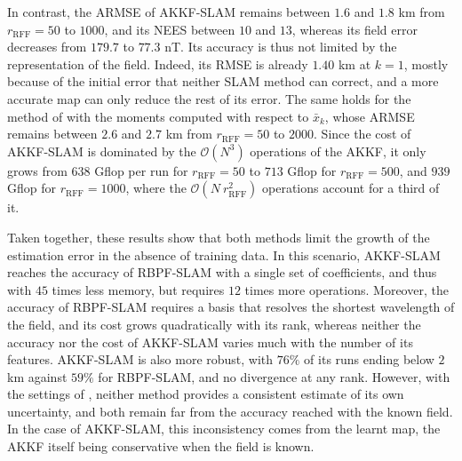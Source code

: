 In contrast, the ARMSE of AKKF-SLAM remains between $1.6$ and $1.8$ km from $r_{\mathrm{RFF}}=50$ to $1000$, and its NEES between $10$ and $13$, whereas its field error decreases from $179.7$ to $77.3$ nT. Its accuracy is thus not limited by the representation of the field. Indeed, its RMSE is already $1.40$ km at $k=1$, mostly because of the initial error that neither SLAM method can correct, and a more accurate map can only reduce the rest of its error. The same holds for the method of \cite{bib:RFF-KKF-SLAM} with the moments computed with respect to $\bar{x}_k$, whose ARMSE remains between $2.6$ and $2.7$ km from $r_{\mathrm{RFF}}=50$ to $2000$. Since the cost of AKKF-SLAM is dominated by the $\mathcal{O}\left(N^3\right)$ operations of the AKKF, it only grows from $638$ Gflop per run for $r_{\mathrm{RFF}}=50$ to $713$ Gflop for $r_{\mathrm{RFF}}=500$, and $939$ Gflop for $r_{\mathrm{RFF}}=1000$, where the $\mathcal{O}\left(N\:r_{\mathrm{RFF}}^2\right)$ operations account for a third of it.

Taken together, these results show that both methods limit the growth of the estimation error in the absence of training data. In this scenario, AKKF-SLAM reaches the accuracy of RBPF-SLAM with a single set of coefficients, and thus with $45$ times less memory, but requires $12$ times more operations. Moreover, the accuracy of RBPF-SLAM requires a basis that resolves the shortest wavelength of the field, and its cost grows quadratically with its rank, whereas neither the accuracy nor the cost of AKKF-SLAM varies much with the number of its features. AKKF-SLAM is also more robust, with $76\%$ of its runs ending below $2$ km against $59\%$ for RBPF-SLAM, and no divergence at any rank. However, with the settings of , neither method provides a consistent estimate of its own uncertainty, and both remain far from the accuracy reached with the known field. In the case of AKKF-SLAM, this inconsistency comes from the learnt map, the AKKF itself being conservative when the field is known.

